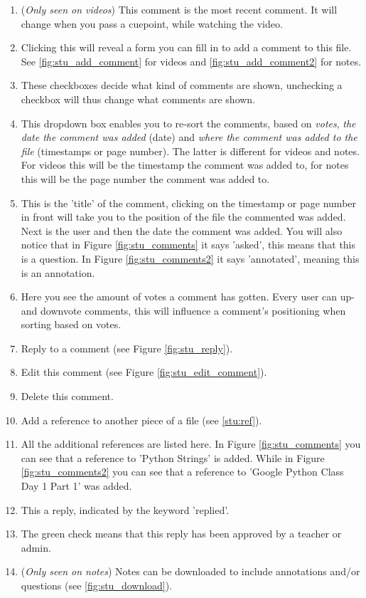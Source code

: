 \documentclass[a4paper,11pt]{report}
\begin{document}
\begin{enumerate}
\item (\textit{Only seen on videos}) This comment is the most recent comment. It will change when you pass a cuepoint, while watching the video.
\item Clicking this will reveal a form you can fill in to add a comment to this file. See \ref{fig:stu_add_comment} for videos and \ref{fig:stu_add_comment2} for notes.
\item These checkboxes decide what kind of comments are shown, unchecking a checkbox will thus change what comments are shown.
\item This dropdown box enables you to re-sort the comments, based on \textit{votes}, \textit{the date the comment was added} (date) and \textit{where the comment was added to the file} (timestamps or page number). The latter is different for videos and notes. For videos this will be the timestamp the comment was added to, for notes this will be the page number the comment was added to.
\item This is the 'title' of the comment, clicking on the timestamp or page number in front will take you to the position of the file the commented was added. Next is the user and then the date the comment was added. You will also notice that in Figure \ref{fig:stu_comments} it says 'asked', this means that this is a question. In Figure \ref{fig:stu_comments2} it says 'annotated', meaning this is an annotation.
\item Here you see the amount of votes a comment has gotten. Every user can up- and downvote comments, this will influence a comment's positioning when sorting based on votes.
\item Reply to a comment (see Figure \ref{fig:stu_reply}).
\item Edit this comment (see Figure \ref{fig:stu_edit_comment}).
\item Delete this comment.
\item Add a reference to another piece of a file (see \ref{stu:ref}).
\item All the additional references are listed here. In Figure \ref{fig:stu_comments} you can see that a reference to 'Python Strings' is added. While in Figure \ref{fig:stu_comments2} you can see that a reference to 'Google Python Class Day 1 Part 1' was added.
\item This a reply, indicated by the keyword 'replied'.
\item The green check means that this reply has been approved by a teacher or admin.
\item (\textit{Only seen on notes}) Notes can be downloaded to include annotations and/or questions (see \ref{fig:stu_download}).
\end{enumerate}
\end{document}
